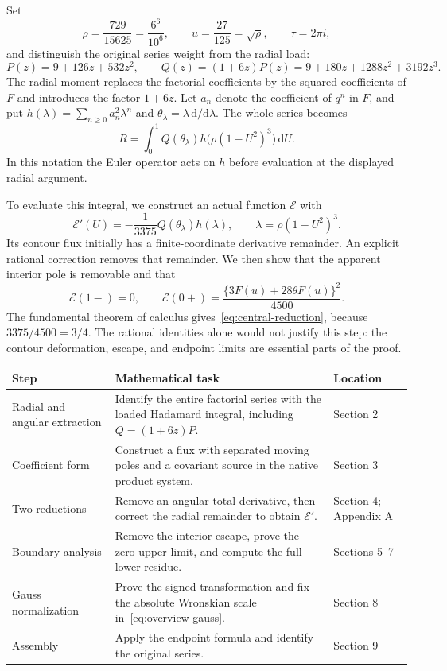 \documentclass[11pt,a4paper]{article}
\newcommand{\dd}{\mathrm d}
\begin{document}
Set
\begin{equation}\label{eq:constants}
 \rho=\frac{729}{15625}=\frac{6^6}{10^6},\qquad
 u=\frac{27}{125}=\sqrt\rho,\qquad \tau=2\pi i,
\end{equation}
and distinguish the original series weight from the radial load:
\begin{equation}\label{eq:weights}
 P(z)=9+126z+532z^2,\qquad
 Q(z)=(1+6z)P(z)=9+180z+1288z^2+3192z^3.
\end{equation}
The radial moment replaces the factorial coefficients by the squared
coefficients of $F$ and introduces the factor $1+6z$. Let $a_n$ denote
the coefficient of $q^n$ in $F$, and put
$h(\lambda)=\sum_{n\geq0}a_n^2\lambda^n$ and
$\theta_\lambda=\lambda\,\dd/\dd\lambda$. The whole series becomes
\[
 R=\int_0^1 Q(\theta_\lambda)h\bigl(\rho(1-U^2)^3\bigr)\,\dd U.
\]
In this notation the Euler operator acts on $h$ before evaluation at
the displayed radial argument.

To evaluate this integral, we construct an actual function $\mathcal E$
with
\[
 \mathcal E'(U)=-\frac1{3375}Q(\theta_\lambda)h(\lambda),
 \qquad \lambda=\rho(1-U^2)^3.
\]
Its contour flux initially has a finite-coordinate derivative remainder.
An explicit rational correction removes that remainder. We then show that
the apparent interior pole is removable and that
\[
 \mathcal E(1-)=0,\qquad
 \mathcal E(0+)=\frac{\{3F(u)+28\theta F(u)\}^2}{4500}.
\]
The fundamental theorem of calculus gives~\eqref{eq:central-reduction},
because $3375/4500=3/4$. The rational identities alone would not justify
this step: the contour deformation, escape, and endpoint limits are
essential parts of the proof.

\begin{center}
\small
\begin{tabular}{@{}>{\raggedright\arraybackslash}p{.19\linewidth}>{\raggedright\arraybackslash}p{.61\linewidth}>{\raggedright\arraybackslash}p{.12\linewidth}@{}}
\toprule
Step & Mathematical task & Location\\
\midrule
Radial and angular extraction & Identify the entire factorial series with
the loaded Hadamard integral, including $Q=(1+6z)P$. & Section 2\\[3pt]
Coefficient form & Construct a flux with separated moving poles and a
covariant source in the native product system. & Section 3\\[3pt]
Two reductions & Remove an angular total derivative, then correct the
radial remainder to obtain $\mathcal E'$. & Section 4; Appendix A\\[3pt]
Boundary analysis & Remove the interior escape, prove the zero upper limit,
and compute the full lower residue. & Sections 5--7\\[3pt]
Gauss normalization & Prove the signed transformation and fix the absolute
Wronskian scale in~\eqref{eq:overview-gauss}. & Section 8\\[3pt]
Assembly & Apply the endpoint formula and identify the original series.
& Section 9\\
\bottomrule
\end{tabular}
\end{center}
\end{document}
